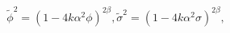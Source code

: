 \begin{equation} 
\tilde \phi^2 = \left(1 - 4k\alpha^2 \phi\right)^{2\beta}, \label{posia1}
\tilde \sigma^2 = \left(1-4k\alpha^2 \sigma\right)^{2\beta} \label{posia2},
\end{equation} 
